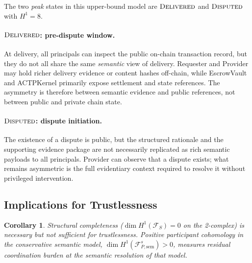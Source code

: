 \documentclass[11pt]{article}
\theoremstyle{plain}
\newtheorem{corollary}[theorem]{Corollary}
\theoremstyle{definition}
\newcommand{\Fsh}{\mathcal{F}}         %
\newcommand{\Hone}{H^{1}}
\newcommand{\dimn}{\operatorname{dim}}
\newcommand{\sDELIV}{\textsc{Delivered}}
\newcommand{\sDISP}{\textsc{Disputed}}
\begin{document}
The two \emph{peak} states in this upper-bound model are $\sDELIV$ and
$\sDISP$ with $\Hone = 8$.

\paragraph{$\sDELIV$: pre-dispute window.}
At delivery, all principals can inspect the public on-chain transaction
record, but they do not all share the same \emph{semantic} view of delivery.
Requester and Provider may hold richer delivery evidence or content hashes
off-chain, while EscrowVault and ACTPKernel primarily expose settlement and
state references.  The asymmetry is therefore between semantic evidence and
public references, not between public and private chain state.

\paragraph{$\sDISP$: dispute initiation.}
The existence of a dispute is public, but the structured rationale and the
supporting evidence package are not necessarily replicated as rich semantic
payloads to all principals.  Provider can observe that a dispute exists; what
remains asymmetric is the full evidentiary context required to resolve it
without privileged intervention.

\subsection{Implications for Trustlessness}
\label{sec:trustlessness}

\begin{corollary}\label{cor:trustlessness}
Structural completeness ($\dimn\Hone(\Fsh_S) = 0$ on the 2-complex) is
necessary but not sufficient for trustlessness.  Positive participant
cohomology in the conservative semantic model,
$\dimn\Hone(\Fsh_{P,\mathrm{sem}}^s) > 0$, measures residual coordination
burden at the semantic resolution of that model.
\end{corollary}
\end{document}
